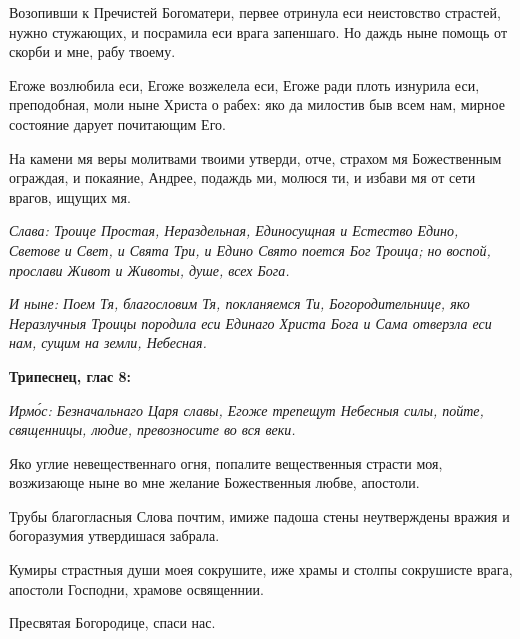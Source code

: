
Возопивши к Пречистей Богоматери, первее отринула еси неистовство страстей, нужно стужающих, и посрамила еси врага запеншаго. Но даждь ныне помощь от скорби и мне, рабу твоему.


Егоже возлюбила еси, Егоже возжелела еси, Егоже ради плоть изнурила еси, преподобная, моли ныне Христа о рабех: яко да милостив быв всем нам, мирное состояние дарует почитающим Его.


На камени мя веры молитвами твоими утверди, отче, страхом мя Божественным ограждая, и покаяние, Андрее, подаждь ми, молюся ти, и избави мя от сети врагов, ищущих мя.

\itshape Слава\normalfont{}: Троице Простая, Нераздельная, Единосущная и Естество Едино, Светове и Свет, и Свята Три, и Едино Свято поется Бог Троица; но воспой, прослави Живот и Животы, душе, всех Бога.

\itshape И ныне\normalfont{}: Поем Тя, благословим Тя, покланяемся Ти, Богородительнице, яко Неразлучныя Троицы породила еси Единаго Христа Бога и Сама отверзла еси нам, сущим на земли, Небесная. 

\medskip\bfseries Трипеснец, глас 8:

\normalfont{}


\itshape Ирм\'{о}с\normalfont{}: Безначальнаго Царя славы, Егоже трепещут Небесныя силы, пойте, священницы, людие, превозносите во вся веки.


Яко углие невещественнаго огня, попалите вещественныя страсти моя, возжизающе ныне во мне желание Божественныя любве, апостоли.


Трубы благогласныя Слова почтим, имиже падоша стены неутверждены вражия и богоразумия утвердишася забрала.


Кумиры страстныя души моея сокрушите, иже храмы и столпы сокрушисте врага, апостоли Господни, храмове освященнии.

Пресвятая Богородице, спаси нас.

